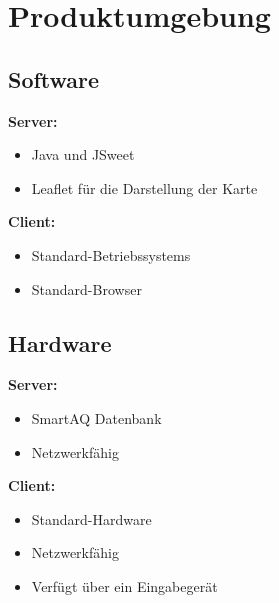 \section{Produktumgebung}
\subsection{Software}
\textbf{Server:}
\begin{itemize}
    \item Java und JSweet
    \item Leaflet für die Darstellung der Karte
\end{itemize}
\textbf{ Client:}
\begin{itemize}
    \item \glspl{Standard-Betriebssystem}
    \item \gls{Standard-Browser}
\end{itemize}
\subsection{Hardware}
\textbf{Server:}
\begin{itemize}
    \item SmartAQ Datenbank
    \item Netzwerkfähig 
\end{itemize}
\textbf{Client:}
\begin{itemize}
    \item \gls{Standard-Hardware}
    \item Netzwerkfähig 
    \item Verfügt über ein Eingabegerät
\end{itemize}
